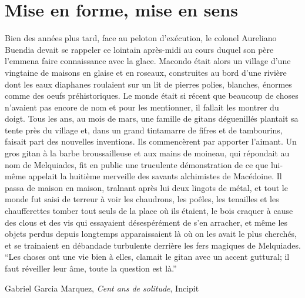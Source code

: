 \documentclass{book}
\begin{document}

\chapter{Mise en forme, mise en sens}

Bien des années plus tard, face au peloton d'exécution, le colonel Aureliano Buendia devait se rappeler ce lointain après-midi au cours duquel son père l'emmena faire connaissance avec la glace. Macondo était alors un village d'une vingtaine de maisons en glaise et en roseaux, construites au bord d'une rivière dont les eaux diaphanes roulaient sur un lit de pierres polies, blanches, énormes comme des oeufs préhistoriques. Le monde était si récent que beaucoup de choses n'avaient pas encore de nom et pour les mentionner, il fallait les montrer du doigt. Tous les ans, au mois de mars, une famille de gitans déguenillés plantait sa tente près du village et, dans un grand tintamarre de fifres et de tambourins, faisait part des nouvelles inventions. Ils commencèrent par apporter l'aimant. Un gros gitan à la barbe broussailleuse et aux mains de moineau, qui répondait au nom de Melquiades, fit en public une truculente démonstration de ce que lui-même appelait la huitième merveille des savants alchimistes de Macédoine. Il passa de maison en maison, tralnant après lui deux lingots de métal, et tout le monde fut saisi de terreur à voir les chaudrons, les poêles, les tenailles et les chaufferettes tomber tout seuls de la place où ils étaient, le bois craquer à cause des clous et des vis qui essayaient désespérément de s'en arracher, et même les objets perdus depuis longtemps apparaissaient là où on les avait le plus cherchés, et se trainaient en débandade turbulente derrière les fers magiques de Melquiades. \enquote{Les choses ont une vie bien à elles, clamait le gitan avec un accent guttural; il faut réveiller leur âme, toute la question est là.}

\begin{flushright}
Gabriel Garcia Marquez, \emph{Cent ans de solitude}, Incipit
\end{flushright}
\end{document}
